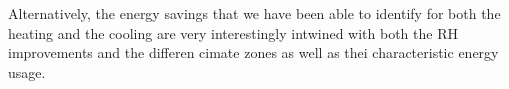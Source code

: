 Alternatively, the energy savings that we have been able to identify for both the heating and the cooling are very interestingly intwined with both the RH improvements and the differen cimate zones as well as thei characteristic energy usage. 

%